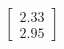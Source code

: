\documentclass[preview]{standalone}
\begin{document}
\begin{align*}
\begin{bmatrix} 2.33 \\ 2.95 \end{bmatrix}
\end{align*}
\end{document}
